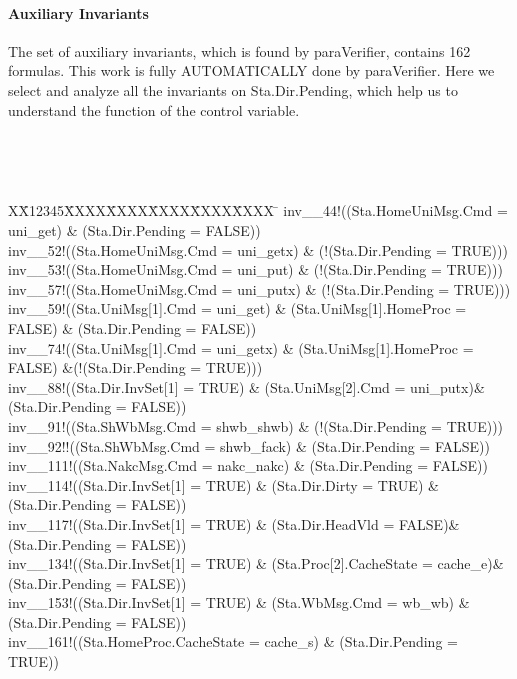 \documentclass{llncs}
\newlength{\fminilength}
\newenvironment{fmini}[1][\linewidth]
  {\setlength{\fminilength}{#1\fboxsep-2\fboxrule}%
   \vspace{2ex}\noindent\begin{lrbox}{\fminibox}\begin{minipage}{\fminilength}%
   \mbox{ }\hfill\vspace{-2.5ex}}%
  {\end{minipage}\end{lrbox}\vspace{1ex}\hspace{0ex}%
   \framebox{\usebox{\fminibox}}}
\newenvironment{specification}
{\noindent\scriptsize
\tt\begin{fmini}\begin{tabbing}X\=X12345\=XXXX\=XXXX\=XXXX\=XXXX\=XXXX
\=\+\kill} {\end{tabbing}\normalfont\end{fmini}}
\begin{document}
\vspace{-20pt}

\paragraph{Auxiliary Invariants }
The set of auxiliary invariants, which is found by {\sf paraVerifier}, contains 162 formulas. This work is  fully AUTOMATICALLY  done by {\sf paraVerifier}.  Here we select and analyze all the invariants on Sta.Dir.Pending, which help us to understand the function of the control variable.

\begin{specification}
inv\_\_44!((Sta.HomeUniMsg.Cmd = uni\_get) \& (Sta.Dir.Pending = FALSE))\\
inv\_\_52!((Sta.HomeUniMsg.Cmd = uni\_getx) \& (!(Sta.Dir.Pending = TRUE)))\\
inv\_\_53!((Sta.HomeUniMsg.Cmd = uni\_put) \& (!(Sta.Dir.Pending = TRUE)))\\
inv\_\_57!((Sta.HomeUniMsg.Cmd = uni\_putx) \& (!(Sta.Dir.Pending = TRUE)))\\
inv\_\_59!((Sta.UniMsg[1].Cmd = uni\_get) \& (Sta.UniMsg[1].HomeProc = FALSE) \& (Sta.Dir.Pending = FALSE))\\
inv\_\_74!((Sta.UniMsg[1].Cmd = uni\_getx) \& (Sta.UniMsg[1].HomeProc = FALSE) \&(!(Sta.Dir.Pending = TRUE)))\\
inv\_\_88!((Sta.Dir.InvSet[1] = TRUE)  \& (Sta.UniMsg[2].Cmd = uni\_putx)\& (Sta.Dir.Pending = FALSE))\\
inv\_\_91!((Sta.ShWbMsg.Cmd = shwb\_shwb) \& (!(Sta.Dir.Pending = TRUE)))\\
inv\_\_92!!((Sta.ShWbMsg.Cmd = shwb\_fack) \& (Sta.Dir.Pending = FALSE))\\
inv\_\_111!((Sta.NakcMsg.Cmd = nakc\_nakc) \& (Sta.Dir.Pending = FALSE))\\
inv\_\_114!((Sta.Dir.InvSet[1] = TRUE) \& (Sta.Dir.Dirty = TRUE) \& (Sta.Dir.Pending = FALSE))\\
inv\_\_117!((Sta.Dir.InvSet[1] = TRUE)  \& (Sta.Dir.HeadVld = FALSE)\& (Sta.Dir.Pending = FALSE))\\
inv\_\_134!((Sta.Dir.InvSet[1] = TRUE)  \& (Sta.Proc[2].CacheState = cache\_e)\& (Sta.Dir.Pending = FALSE))\\
inv\_\_153!((Sta.Dir.InvSet[1] = TRUE) \& (Sta.WbMsg.Cmd = wb\_wb) \& (Sta.Dir.Pending = FALSE))\\
inv\_\_161!((Sta.HomeProc.CacheState = cache\_s) \& (Sta.Dir.Pending = TRUE))\\
\end{specification}
\end{document}
